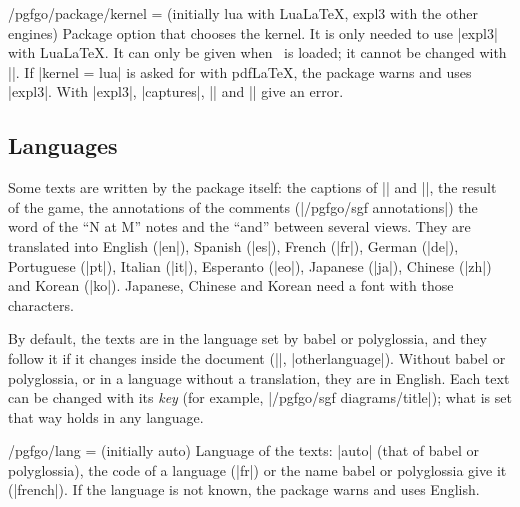 \begin{goban}[9, stone = {radius = 4pt}, mark = {line = {color = red}}]
\begin{key}{/pgfgo/package/kernel =  (initially lua with Lua\LaTeX, expl3 with the other engines)}
	Package option that chooses the kernel. It is only needed to use |expl3| with Lua\LaTeX. It can only be given when \pgfgoname\ is loaded; it cannot be changed with |\pgfgoset|. If |kernel = lua| is asked for with pdf\LaTeX, the package warns and uses |expl3|. With |expl3|, |captures|, || and |\sgf| give an error.

	\begin{codeexample}
		\usepackage[kernel = expl3]{pgf-go}
	\end{codeexample}
\end{key}

\subsection{Languages}
\label{subsec:idiomas}

Some texts are written by the package itself: the captions of |\sgfdiagrams| and |\sgfproblem|, the result of the game, the annotations of the comments (|/pgfgo/sgf annotations|) the word of the ``N at M'' notes and the ``and'' between several views. They are translated into English (|en|), Spanish (|es|), French (|fr|), German (|de|), Portuguese (|pt|), Italian (|it|), Esperanto (|eo|), Japanese (|ja|), Chinese (|zh|) and Korean (|ko|). Japanese, Chinese and Korean need a font with those characters.

By default, the texts are in the language set by babel or polyglossia, and they follow it if it changes inside the document (|\selectlanguage|, |otherlanguage|). Without babel or polyglossia, or in a language without a translation, they are in English. Each text can be changed with its \emph{key} (for example, |/pgfgo/sgf diagrams/title|); what is set that way holds in any language.

\begin{key}{/pgfgo/lang =  (initially auto)}
	Language of the texts: |auto| (that of babel or polyglossia), the code of a language (|fr|) or the name babel or polyglossia give it (|french|). If the language is not known, the package warns and uses English.

	\begin{codeexample}
	\end{codeexample}
\end{key}


\end{goban}
